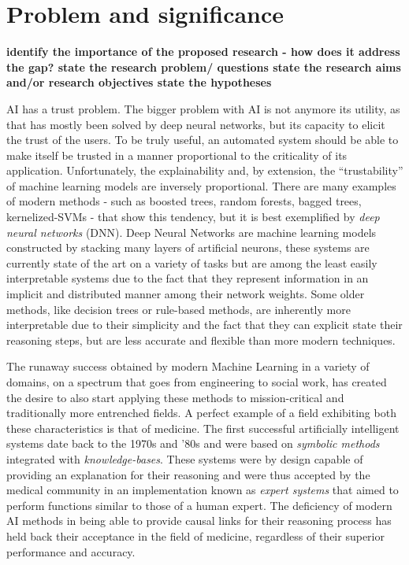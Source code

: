 
\section{Problem and significance}
\textbf{identify the importance of the proposed research - how does it address the gap? state the research problem/ questions state the research aims and/or research objectives state the hypotheses
}


AI has a trust problem.  The bigger problem with AI is not anymore its utility, as that has mostly been solved by  deep neural networks, but its capacity to elicit the trust of the users.
To be truly useful, an automated system should be able to make itself be trusted in a manner proportional to the criticality of its application.  Unfortunately, the explainability and, by extension, the \enquote{trustability} of machine learning models are inversely proportional.  There are many examples of modern methods - such as boosted trees, random forests, bagged trees, kernelized-SVMs - that show this tendency, but it is best exemplified by\textit{ deep neural networks} (DNN). Deep Neural Networks are machine learning models constructed by stacking many layers of artificial neurons, these systems are currently state of the art on a variety of tasks but are among the least easily interpretable systems due to the fact that they represent information in an implicit and distributed manner among their network weights.  Some older methods, like decision trees or rule-based methods, are inherently more interpretable due to their simplicity and the fact that they can explicit state their reasoning steps, but are less accurate and flexible than more modern techniques. 

The runaway success obtained by modern Machine Learning in a variety of domains, on a spectrum that goes from engineering to social work, has created the desire to also start applying these methods to mission-critical and traditionally more entrenched fields.  A perfect example of a field exhibiting both these characteristics is that of medicine.  The first successful artificially intelligent systems date back to the 1970s and '80s and were based on \textit{symbolic methods} integrated with \textit{knowledge-bases}.  These systems were by design capable of providing an explanation for their reasoning and were thus accepted by the medical community in an implementation known as \textit{expert systems} that aimed to perform functions similar to those of a human expert.  The deficiency of modern AI methods in being able to provide causal links for their reasoning process has held back their acceptance in the field of medicine, regardless of their superior performance and accuracy.

